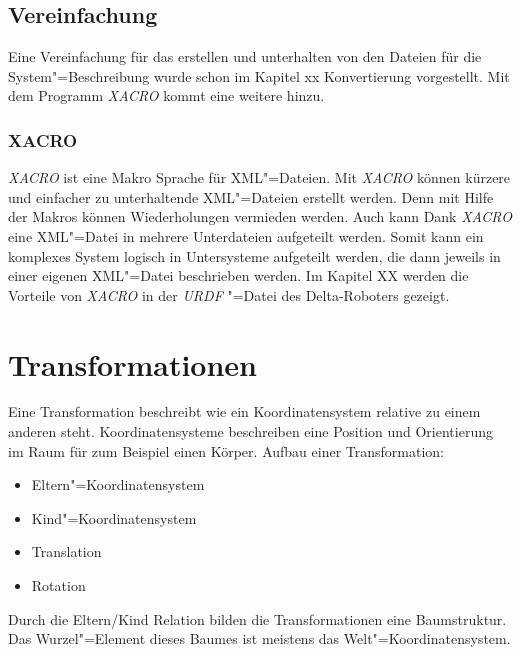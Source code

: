 \subsection{Vereinfachung}
Eine Vereinfachung für das erstellen und unterhalten von den Dateien für die System"=Beschreibung wurde schon im Kapitel xx Konvertierung vorgestellt. %
Mit dem Programm \textit{XACRO} kommt eine weitere hinzu. 

\subsubsection{XACRO} %
\textit{XACRO} ist eine Makro Sprache für XML"=Dateien. %
Mit \textit{XACRO} können kürzere und einfacher zu unterhaltende XML"=Dateien erstellt werden.
Denn mit Hilfe der Makros können Wiederholungen vermieden werden.
Auch kann Dank \textit{XACRO} eine XML"=Datei in mehrere Unterdateien aufgeteilt werden.
Somit kann ein komplexes System logisch in Untersysteme aufgeteilt werden, die dann jeweils in einer eigenen XML"=Datei beschrieben werden. 
Im Kapitel XX werden die Vorteile von \textit{XACRO} in der \textit{URDF} "=Datei des Delta-Roboters gezeigt.

\section{Transformationen} %
Eine Transformation beschreibt wie ein Koordinatensystem relative zu einem anderen steht.
Koordinatensysteme beschreiben eine Position und Orientierung im Raum für zum Beispiel einen Körper.
Aufbau einer Transformation:
\begin{itemize}
\item Eltern"=Koordinatensystem
\item Kind"=Koordinatensystem
\item Translation
\item Rotation
\end{itemize}

Durch die Eltern/Kind Relation bilden die Transformationen eine Baumstruktur.
Das Wurzel"=Element dieses Baumes ist meistens das Welt"=Koordinatensystem.


